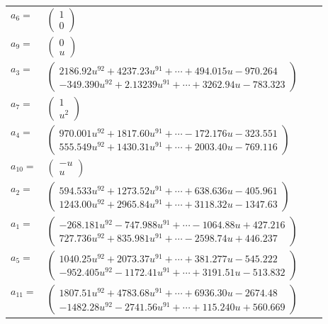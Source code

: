 \documentclass[1p]{elsarticle_modified}
\theoremstyle{definition}
\begin{document}
\begin{tabular}{m{7pt} m{180pt} m{7pt} m{180pt} }
\flushright $a_{6}=$&$\begin{pmatrix}1\\0\end{pmatrix}$ \\
\flushright $a_{9}=$&$\begin{pmatrix}0\\u\end{pmatrix}$ \\
\flushright $a_{3}=$&$\begin{pmatrix}2186.92 u^{92}+4237.23 u^{91}+\cdots+494.015 u-970.264\\-349.390 u^{92}+2.13239 u^{91}+\cdots+3262.94 u-783.323\end{pmatrix}$ \\
\flushright $a_{7}=$&$\begin{pmatrix}1\\u^2\end{pmatrix}$ \\
\flushright $a_{4}=$&$\begin{pmatrix}970.001 u^{92}+1817.60 u^{91}+\cdots-172.176 u-323.551\\555.549 u^{92}+1430.31 u^{91}+\cdots+2003.40 u-769.116\end{pmatrix}$ \\
\flushright $a_{10}=$&$\begin{pmatrix}- u\\u\end{pmatrix}$ \\
\flushright $a_{2}=$&$\begin{pmatrix}594.533 u^{92}+1273.52 u^{91}+\cdots+638.636 u-405.961\\1243.00 u^{92}+2965.84 u^{91}+\cdots+3118.32 u-1347.63\end{pmatrix}$ \\
\flushright $a_{1}=$&$\begin{pmatrix}-268.181 u^{92}-747.988 u^{91}+\cdots-1064.88 u+427.216\\727.736 u^{92}+835.981 u^{91}+\cdots-2598.74 u+446.237\end{pmatrix}$ \\
\flushright $a_{5}=$&$\begin{pmatrix}1040.25 u^{92}+2073.37 u^{91}+\cdots+381.277 u-545.222\\-952.405 u^{92}-1172.41 u^{91}+\cdots+3191.51 u-513.832\end{pmatrix}$ \\
\flushright $a_{11}=$&$\begin{pmatrix}1807.51 u^{92}+4783.68 u^{91}+\cdots+6936.30 u-2674.48\\-1482.28 u^{92}-2741.56 u^{91}+\cdots+115.240 u+560.669\end{pmatrix}$ \\

\end{tabular}
\end{document}
